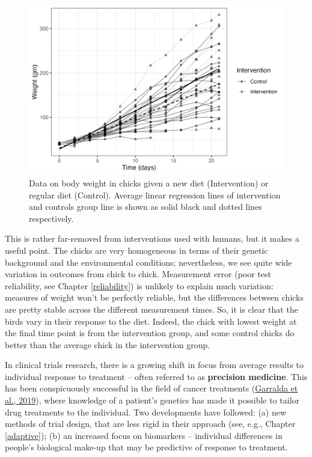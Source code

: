 \documentclass{krantz}
\begin{document}
\begin{figure}
\includegraphics[width=0.9\linewidth]{images_bw/interventionhet} \caption{Data on body weight in chicks given a new diet (Intervention) or regular diet (Control). Average linear regression lines of intervention and controls group line is shown as solid black and dotted lines respectively.}\label{fig:interventionhet}
\end{figure}

This is rather far-removed from interventions used with humans, but it makes a useful point. The chicks are very homogeneous in terms of their genetic background and the environmental conditions; nevertheless, we see quite wide variation in outcomes from chick to chick. Measurement error (poor test reliability, see Chapter \ref{reliability}) is unlikely to explain much variation: measures of weight won't be perfectly reliable, but the differences between chicks are pretty stable across the different measurement times. So, it is clear that the birds vary in their response to the diet. Indeed, the chick with lowest weight at the final time point is from the intervention group, and some control chicks do better than the average chick in the intervention group.

In clinical trials research, there is a growing shift in focus from average results to individual response to treatment -- often referred to as \textbf{precision medicine}. This has been conspicuously successful in the field of cancer treatments (\protect\hyperlink{ref-garralda2019}{Garralda et al., 2019}), where knowledge of a patient's genetics has made it possible to tailor drug treatments to the individual. Two developments have followed: (a) new methods of trial design, that are less rigid in their approach (see, e.g., Chapter \ref{adaptive}); (b) an increased focus on biomarkers -- individual differences in people's biological make-up that may be predictive of response to treatment.
\end{document}
